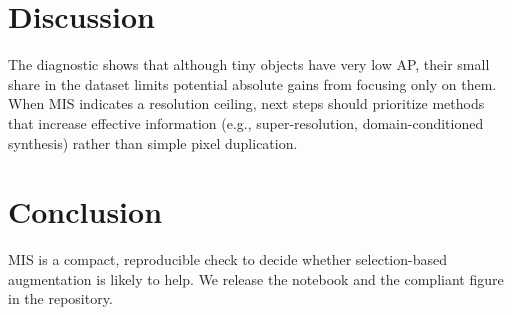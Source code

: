 \documentclass[a4paper,conference,10pt]{IEEEtran}
\begin{document}
\section{Discussion}
The diagnostic shows that although tiny objects have very low AP, their small share in the dataset limits potential absolute gains from focusing only on them. When MIS indicates a resolution ceiling, next steps should prioritize methods that increase effective information (e.g., super-resolution, domain-conditioned synthesis) rather than simple pixel duplication.
\section{Conclusion}
MIS is a compact, reproducible check to decide whether selection-based augmentation is likely to help. We release the notebook and the compliant figure in the repository.


\end{document}

